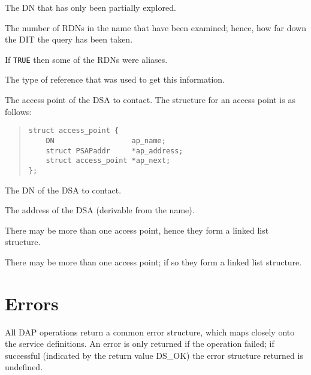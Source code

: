 \begin{describe}
\item [\verb"cr\_name":] The DN that has only been partially explored.
\item [\verb"cr\_rdn\_resolved":] The number of RDNs in the name that have
been examined; hence, how far down the DIT the query has been taken.
\item [\verb"cr\_aliasedRDNs":] If \verb"TRUE" then some of the RDNs were
aliases.
\item [\verb"cr\_reftype":] The type of reference that was used to get this
information.
\item [\verb"cr\_accesspoints":] The access point of the DSA to 
contact.
The structure for an access point is as follows:
\begin{quote}\small\begin{verbatim}
struct access_point { 
    DN                  ap_name;
    struct PSAPaddr     *ap_address;
    struct access_point *ap_next;
};
\end{verbatim}\end{quote}
\begin{describe}
\item [\verb"ap\_name":] The DN of the DSA to contact.
\item [\verb"ap\_address":] The address of the DSA (derivable from 
the name).
\item [\verb"ap\_next":] There may be more than one access point, hence they
form a linked list structure.
\end{describe}
\item [\verb"cr\_next":] There may be more than one access point; if so they form
a linked list structure.
\end{describe}


\section {Errors}

All DAP operations return a common error structure, which maps closely 
onto the service definitions.
An error is only returned if the operation failed; if successful (indicated
by the return value DS\_OK) the error structure returned is undefined.

